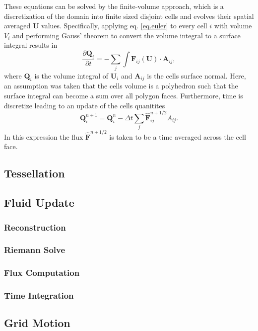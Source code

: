 These equations can be solved by the finite-volume approach, which is a discretization
of the domain into finite sized disjoint cells and evolves their spatial averaged
$\mathbf{U}$ values. Specifically, applying eq. \ref{eq.euler} to every cell $i$ with
volume $V_i$ and performing Gauss' theorem to convert the volume integral to a
surface integral results in
%
\begin{equation}
    \label{eq.euler_int}
    \frac{\partial{\mathbf{Q}}_i}{\partial{t}} =
    -\sum_{j}\int\mathbf{F}_{ij}(\mathbf{U})\cdot\mathbf{A}_{ij},
\end{equation}
%
where $\mathbf{Q}_i$ is the volume integral of $\mathbf{U}_i$ and $\mathbf{A}_{ij}$ is the
cells surface normal. Here, an assumption was taken that the cells volume is a polyhedron
such that the surface integral can become a sum over all polygon faces. Furthermore, time
is discretize leading to an update of the cells quanitites
%
\begin{equation}
    \mathbf{Q}_i^{n+1} = \mathbf{Q}_i^n - \Delta t\sum_j \mathbf{\hat{F}}_{ij}^{n+1/2} A_{ij}.
\end{equation}
%
In this expression the flux $\mathbf{\hat{F}}^{n+1/2}$ is taken to be a time averaged across
the cell face.


\subsection{Tessellation}

\subsection{Fluid Update}
\subsubsection{Reconstruction}
\subsubsection{Riemann Solve}
\subsubsection{Flux Computation}
\subsubsection{Time Integration}

\subsection{Grid Motion}
